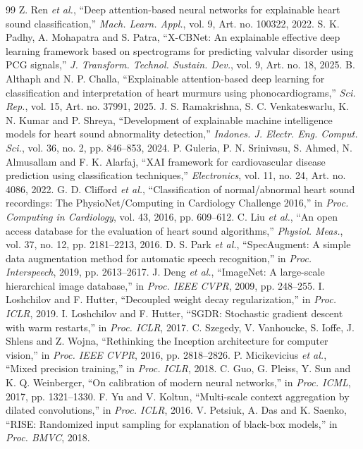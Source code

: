 \documentclass[conference]{IEEEtran}
\begin{document}
\begin{thebibliography}{99}
 Z. Ren \textit{et al.}, ``Deep attention-based neural networks for explainable heart sound classification,'' \textit{Mach. Learn. Appl.}, vol. 9, Art. no. 100322, 2022.
 S. K. Padhy, A. Mohapatra and S. Patra, ``X-CBNet: An explainable effective deep learning framework based on spectrograms for predicting valvular disorder using PCG signals,'' \textit{J. Transform. Technol. Sustain. Dev.}, vol. 9, Art. no. 18, 2025.
 B. Althaph and N. P. Challa, ``Explainable attention-based deep learning for classification and interpretation of heart murmurs using phonocardiograms,'' \textit{Sci. Rep.}, vol. 15, Art. no. 37991, 2025.
 J. S. Ramakrishna, S. C. Venkateswarlu, K. N. Kumar and P. Shreya, ``Development of explainable machine intelligence models for heart sound abnormality detection,'' \textit{Indones. J. Electr. Eng. Comput. Sci.}, vol. 36, no. 2, pp. 846--853, 2024.
 P. Guleria, P. N. Srinivasu, S. Ahmed, N. Almusallam and F. K. Alarfaj, ``XAI framework for cardiovascular disease prediction using classification techniques,'' \textit{Electronics}, vol. 11, no. 24, Art. no. 4086, 2022.
 G. D. Clifford \textit{et al.}, ``Classification of normal/abnormal heart sound recordings: The PhysioNet/Computing in Cardiology Challenge 2016,'' in \textit{Proc. Computing in Cardiology}, vol. 43, 2016, pp. 609--612.
 C. Liu \textit{et al.}, ``An open access database for the evaluation of heart sound algorithms,'' \textit{Physiol. Meas.}, vol. 37, no. 12, pp. 2181--2213, 2016.
 D. S. Park \textit{et al.}, ``SpecAugment: A simple data augmentation method for automatic speech recognition,'' in \textit{Proc. Interspeech}, 2019, pp. 2613--2617.
 J. Deng \textit{et al.}, ``ImageNet: A large-scale hierarchical image database,'' in \textit{Proc. IEEE CVPR}, 2009, pp. 248--255.
 I. Loshchilov and F. Hutter, ``Decoupled weight decay regularization,'' in \textit{Proc. ICLR}, 2019.
 I. Loshchilov and F. Hutter, ``SGDR: Stochastic gradient descent with warm restarts,'' in \textit{Proc. ICLR}, 2017.
 C. Szegedy, V. Vanhoucke, S. Ioffe, J. Shlens and Z. Wojna, ``Rethinking the Inception architecture for computer vision,'' in \textit{Proc. IEEE CVPR}, 2016, pp. 2818--2826.
 P. Micikevicius \textit{et al.}, ``Mixed precision training,'' in \textit{Proc. ICLR}, 2018.
 C. Guo, G. Pleiss, Y. Sun and K. Q. Weinberger, ``On calibration of modern neural networks,'' in \textit{Proc. ICML}, 2017, pp. 1321--1330.
 F. Yu and V. Koltun, ``Multi-scale context aggregation by dilated convolutions,'' in \textit{Proc. ICLR}, 2016.
 V. Petsiuk, A. Das and K. Saenko, ``RISE: Randomized input sampling for explanation of black-box models,'' in \textit{Proc. BMVC}, 2018.
\end{thebibliography}
\end{document}
